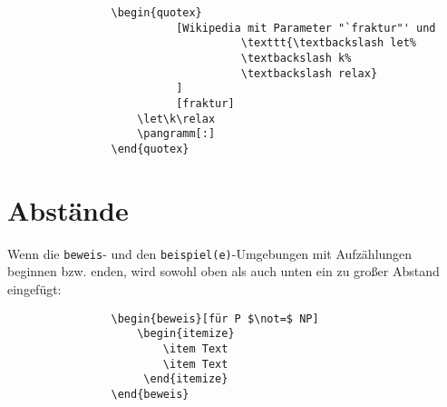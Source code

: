 			\begin{verbatim}
				\begin{quotex}
				          [Wikipedia mit Parameter "`fraktur"' und 
					                \texttt{\textbackslash let%
					                \textbackslash k%
					                \textbackslash relax}
					      ]
				          [fraktur]
				    \let\k\relax
				    \pangramm[:]
				\end{quotex}
			\end{verbatim}
			
			
		\newpage
		\section{Abstände}
			\label{abstaende beweis beispiel}
			Wenn die \texttt{beweis}- und den \texttt{beispiel(e)}-Umgebungen mit Aufzählungen beginnen bzw. enden, wird sowohl oben als auch unten ein zu großer Abstand eingefügt:
			
			\begin{verbatim}
				\begin{beweis}[für P $\not=$ NP]
				    \begin{itemize} 
				        \item Text 
				        \item Text 
				     \end{itemize}
				\end{beweis}
			\end{verbatim}
			
			
